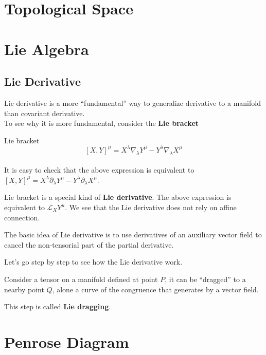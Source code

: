 \documentclass[12pt]{article}
\theoremstyle{mystyle}{\newtheorem{definition}{Definition}[subsection]}
\theoremstyle{mystyle}{\newtheorem{theorem}[definition]{Theorem}}
\theoremstyle{mystyle}{\newtheorem*{remark}{Remark}}
\theoremstyle{mystyle}{\newtheorem{example}{Example}[subsection]}
\theoremstyle{mystyle}{\newtheorem{examples}{Examples}[subsection]}
\theoremstyle{mystyle}{\newtheorem{cthm}{}[subsection]}
\begin{document}
\newpage
\section{Topological Space}
\newpage
\section{Lie Algebra}

\subsection{Lie Derivative}
Lie derivative is a more ``fundamental'' way to generalize derivative to a manifold than covariant derivative. \\
To see why it is more fundamental, consider the \textbf{Lie bracket}
\begin{definition}
  Lie bracket
  \bigskip
  \[\left[X, Y\right]^{\mu}= X^{\lambda}\nabla_{\lambda}Y^{\mu} - Y^{\lambda}\nabla_\lambda X^{\mu}\]\\
  It is easy to check that the above expression is equivalent to
  \(\left[X, Y\right]^{\mu}= X^{\lambda}\partial_{\lambda}Y^{\mu} - Y^{\lambda}\partial_\lambda X^{\mu}\).
\end{definition}

Lie bracket is a special kind of \textbf{Lie derivative}. The above expression is equivalent to
\(\mathcal{L}_{X}Y^{\mu}\). We see that the Lie derivative does not rely on affine connection.

The basic idea of Lie derivative is to use derivatives of an auxiliary vector field to
cancel the non-tensorial part of the partial derivative.

Let's go step by step to see how the Lie derivative work.

Consider a tensor on a manifold defined at point \(P\), it can be ``dragged'' to a nearby point \(Q\), alone
a curve of the congruence that generates by a vector field.

This step is called \textbf{Lie dragging}.

\newpage

\section{Penrose Diagram}
\end{document}
